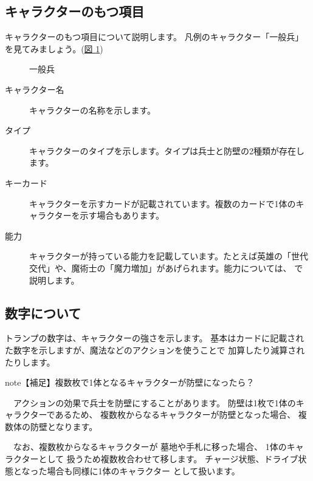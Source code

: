 \documentclass[letterpaper,10pt,dvipdfmx]{sphinxmanual}
\begin{document}
\subsection{キャラクターのもつ項目}
\label{\detokenize{common/04-character:id3}}
キャラクターのもつ項目について説明します。
凡例のキャラクター「一般兵」を見てみましょう。(\hyperref[\detokenize{common/04-character:character-sample}]{図 \ref{\detokenize{common/04-character:character-sample}}})

\begin{figure}[htbp]
\centering
\capstart

\noindent{}
\caption{一般兵}\label{\detokenize{common/04-character:id11}}\label{\detokenize{common/04-character:character-sample}}\end{figure}
\begin{description}
\item[{キャラクター名}] \leavevmode
キャラクターの名称を示します。

\item[{タイプ}] \leavevmode
キャラクターのタイプを示します。タイプは兵士と防壁の2種類が存在します。

\item[{キーカード}] \leavevmode
キャラクターを示すカードが記載されています。複数のカードで1体のキャラクターを示す場合もあります。

\item[{能力}] \leavevmode
キャラクターが持っている能力を記載しています。たとえば英雄の「世代交代」や、魔術士の「魔力増加」があげられます。能力については、 {\hyperref[\detokenize{common/04-character:abi}]{}} で説明します。

\end{description}


\subsection{数字について}
\label{\detokenize{common/04-character:id4}}
トランプの数字は、キャラクターの強さを示します。
基本はカードに記載された数字を示しますが、魔法などのアクションを使うことで
加算したり減算されたりします。

\begin{sphinxadmonition}{note}{【補足】複数枚で1体となるキャラクターが防壁になったら？}

　アクションの効果で兵士を防壁にすることがあります。
防壁は1枚で1体のキャラクターであるため、
複数枚からなるキャラクターが防壁となった場合、
複数体の防壁となります。

　なお、複数枚からなるキャラクターが
墓地や手札に移った場合、
1体のキャラクターとして
扱うため複数枚合わせて移します。
チャージ状態、ドライブ状態となった場合も同様に1体のキャラクター
として扱います。
\end{sphinxadmonition}
\end{document}
